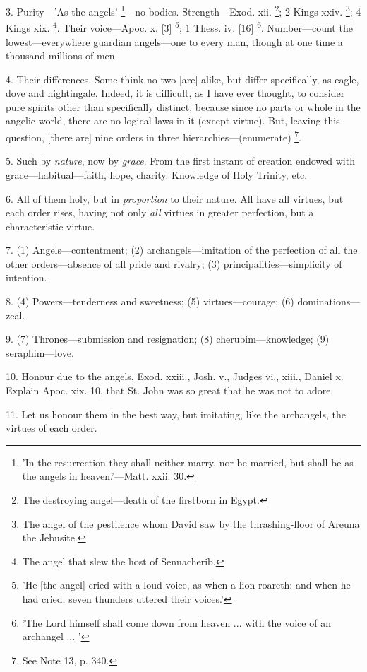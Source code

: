 3. Purity—'As the angels' \footnote{'In the resurrection
they shall neither marry, nor be married, but shall be as the angels
in heaven.'—Matt. xxii. 30.}—no bodies. Strength—Exod. xii. \footnote{The destroying
angel—death of the firstborn in Egypt.}; 2 Kings xxiv. \footnote{The angel of the
pestilence whom David saw by the thrashing-floor of Areuna the
Jebusite.};
4 Kings xix. \footnote{The angel that slew the
host of Sennacherib.}. Their
voice—Apoc. x. [3] \footnote{'He [the angel] cried
with a loud voice, as when a lion roareth: and when he had cried,
seven thunders uttered their voices.'};
1 Thess. iv. [16] \footnote{'The Lord himself shall
come down from heaven ... with the voice of an archangel ... '}.
Number—count the lowest—everywhere guardian angels—one to every
man, though at one time a thousand millions of men.

4. Their differences. Some think no two [are]
alike, but differ specifically, as eagle, dove and nightingale.
Indeed, it is difficult, as I have ever thought, to consider pure
spirits other than specifically distinct, because since no parts or
whole in the angelic world, there are no logical laws in it (except
virtue). But, leaving this question, [there are] nine orders in three
hierarchies—(enumerate) \footnote{See Note
13, p. 340.}.

5. Such by \emph{nature}, now by \emph{grace}.
From the first instant of creation endowed with
grace—habitual—faith, hope, charity. Knowledge of Holy Trinity,
etc.

6. All of them holy, but in \emph{proportion} to
their nature. All have all virtues, but each order rises, having not
only \emph{all} virtues in greater perfection, but a characteristic
virtue.

7. (1) Angels—contentment; (2)
archangels—imitation of the perfection of all the other
orders—absence of all pride and rivalry; (3)
principalities—simplicity of intention.

8. (4) Powers—tenderness and sweetness; (5)
virtues—courage; (6) dominations—zeal.

9. (7) Thrones—submission and resignation; (8)
cherubim—knowledge; (9) seraphim—love.

10. Honour due to the angels, Exod. xxiii., Josh.
v., Judges vi., xiii., Daniel x. Explain Apoc. xix. 10, that St. John
was so great that he was not to adore.

11. Let us honour them in the best way, but
imitating, like the archangels, the virtues of each order.


